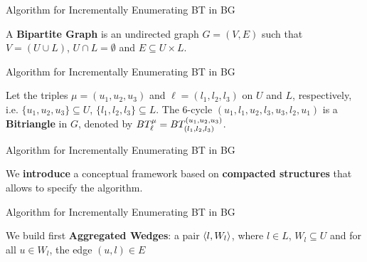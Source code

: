 \begin{frame}[fragile]{Algorithm for Incrementally Enumerating BT in BG}
  \begin{center}
  \large A \textbf{Bipartite Graph} is an undirected graph $G=(V,E)$  such that $V=(U\cup L)$, $U\cap L=\emptyset$ and $E\subseteq U\times L$.
  \end{center}          
  \begin{figure}
    \centering
  \end{figure}
\end{frame}

\begin{frame}[fragile]{Algorithm for Incrementally Enumerating BT in BG}
  \begin{center}
  Let the triples $\mu=(u_1, u_2, u_3)$ and $\ell=(l_1, l_2,l_3)$ on $U$ and $L$, respectively, i.e.  $\{u_1, u_2, u_3\} \subseteq U$, $\{l_1, l_2,l_3\} \subseteq L$. 
  The 6-cycle $(u_1,l_1,u_2,l_3,u_3,l_2,u_1)$  is a \textbf{Bitriangle} in $G$, denoted by $BT_{\ell}^{\mu} = BT_{(l_1, l_2,l_3)}^{(u_1, u_2, u_3)}$. 
  \end{center}      
  \begin{figure}
    \centering
  \end{figure}
\end{frame}

\begin{frame}[fragile]{Algorithm for Incrementally Enumerating BT in BG}
  \begin{center}
    \large We \textbf{introduce} a conceptual framework based on \textbf{compacted structures} that allows to specify the algorithm.
  \end{center}    
\end{frame}

\begin{frame}[fragile]{Algorithm for Incrementally Enumerating BT in BG}
  \begin{center}
    We build first \textbf{Aggregated Wedges}: a pair $\left\langle l, W_l \right\rangle$, where $l \in L$, $W_l \subseteq U$ and for all $u \in W_l$, the edge  $(u,l)\in E$
  \end{center}    
  \begin{figure}
    \centering
  \end{figure}
\end{frame}

